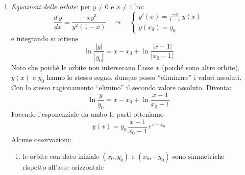 {\begin{enumerate}
    Se $ x=0 $ abbiamo \[
        \begin{cases}
            x'=y^{2}>0 & y>0\\ 
            y'=0
        \end{cases}
    \]
    \begin{figure}
        \begin{center}
        \end{center}
        \caption{Punti con tangenti verticali e orizzontali per l'esempio }
    \end{figure}
    \item \emph{Equazioni delle orbite}: per $ y\neq 0 $ e $ x\neq 1 $ ho: \begin{equation}
        \frac{d\,y}{dx} =\frac{-xy^{3}}{y^{2}(1-x)}\quad\leadsto\quad \begin{cases}
            y'(x)=\displaystyle\frac{-x}{1-x}\,y(x) \label{eq:diff:orb}\\ 
            y(x_0)=y_0
        \end{cases}
    \end{equation}e integrando si ottiene \[
        \ln\frac{|y|}{|y_0|} = x-x_0 + \ln\frac{|x-1|}{|x_0-1|}
    \]Noto che poiché le orbite non intersecano l'asse $ x $ (poiché sono altre orbite), $ y(x) $ e $ y_0 $ hanno lo stesso segno, dunque posso ``eliminare'' i valori assoluti. Con lo stesso ragionamento ``elimino'' il secondo valore assoluto. Diventa: \[
        \ln\frac{y}{y_0} = x-x_0 + \ln\frac{x-1}{x_0-1}
    \]Facendo l'esponenziale da ambo le parti otteniamo \[
        y(x)= y_0\,\frac{x-1}{x_0-1}\,e^{x-x_0}
    \]Alcune osservazioni: \begin{enumerate}
        \item le orbite con dato iniziale $ (x_0,y_0) $ e $ (x_0,-y_0) $ sono simmetriche rispetto all'asse orizzontale 
        

\end{enumerate}
\end{enumerate}}
